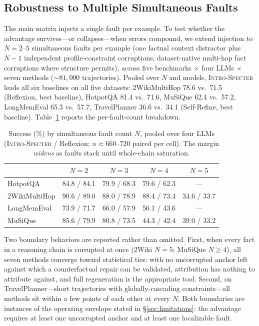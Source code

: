 \documentclass{article}
\newcommand{\method}{\textsc{Intro-Specter}\xspace}
\begin{document}
\subsection{Robustness to Multiple Simultaneous Faults}\label{sec:multifault}

The main matrix injects a single fault per example. To test whether the advantage survives---or collapses---when errors compound, we extend injection to $N{=}2$--$5$ simultaneous faults per example (one factual context distractor plus $N{-}1$ independent profile-constraint corruptions; dataset-native multi-hop fact corruptions where structure permits), across five benchmarks $\times$ four LLMs $\times$ seven methods (${\sim}81{,}000$ trajectories). Pooled over $N$ and models, \method leads all six baselines on all five datasets: 2WikiMultiHop 78.6 vs.\ 71.5 (Reflexion, best baseline), HotpotQA 81.4 vs.\ 71.6, MuSiQue 62.4 vs.\ 57.2, LongMemEval 65.3 vs.\ 57.7, TravelPlanner 36.6 vs.\ 34.1 (Self-Refine, best baseline). Table~\ref{tab:multifault} reports the per-fault-count breakdown.

\begin{table}[t]\centering\small
\caption{Success (\%) by simultaneous fault count $N$, pooled over four LLMs (\method{} / Reflexion; $n{\approx}660$--$720$ paired per cell). The margin \emph{widens} as faults stack until whole-chain saturation.}
\label{tab:multifault}
\begin{tabular}{lcccc}\toprule
 & $N{=}2$ & $N{=}3$ & $N{=}4$ & $N{=}5$ \\\midrule
HotpotQA      & 84.8 / 84.1 & 79.9 / 68.3 & 79.6 / 62.3 & --- \\
2WikiMultiHop & 90.6 / 89.0 & 88.0 / 78.9 & 88.4 / 73.4 & 34.6 / 33.7 \\
LongMemEval   & 73.9 / 71.7 & 66.0 / 57.9 & 56.1 / 43.6 & --- \\
MuSiQue       & 85.6 / 79.9 & 80.8 / 73.5 & 44.3 / 42.4 & 39.0 / 33.2 \\
\bottomrule\end{tabular}\end{table}

Two boundary behaviors are reported rather than omitted. First, when every fact in a reasoning chain is corrupted at once (2Wiki $N{=}5$; MuSiQue $N{\ge}4$), all seven methods converge toward statistical ties: with no uncorrupted anchor left against which a counterfactual repair can be validated, attribution has nothing to attribute against, and full regeneration is the appropriate tool. Second, on TravelPlanner---short trajectories with globally-cascading constraints---all methods sit within a few points of each other at every $N$. Both boundaries are instances of the operating envelope stated in \S\ref{sec:limitations}: the advantage requires at least one uncorrupted anchor and at least one localizable fault.
\end{document}
